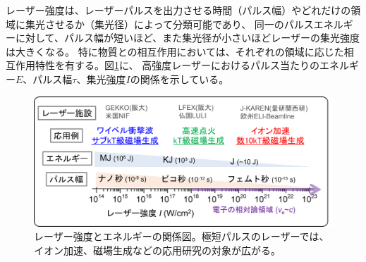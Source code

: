 \documentclass[a4paper,11pt,titlepage]{jsarticle}
\begin{document}
  レーザー強度は、レーザーパルスを出力させる時間（パルス幅）やどれだけの領域に集光させるか（集光径）によって分類可能であり、
  同一のパルスエネルギーに対して、パルス幅が短いほど、また集光径が小さいほどレーザーの集光強度は大きくなる。
  特に物質との相互作用においては、それぞれの領域に応じた相互作用特性を有する。図\ref{fig:pulse}に、
  高強度レーザーにおけるパルス当たりのエネルギー$E$、パルス幅$\tau$、集光強度$I$の関係を示している。
  \begin{figure}[H]
    \begin{center}
      \includegraphics[scale=0.4]{./image/2-pulse.png}
      \caption{
        \label{fig:pulse}
      レーザー強度とエネルギーの関係図。極短パルスのレーザーでは、
      イオン加速、磁場生成などの応用研究の対象が広がる。
      }
    \end{center}
  \end{figure}
\end{document}
